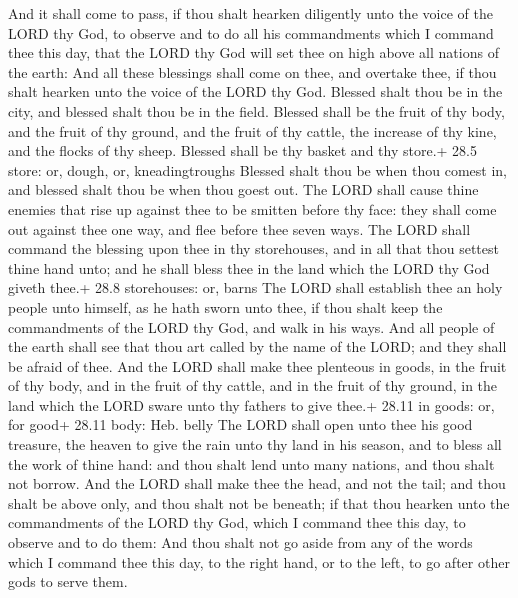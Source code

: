  And it shall come to pass, if thou shalt hearken diligently
unto the voice of the LORD thy God, to observe and to do all his
commandments which I command thee this day, that the LORD thy God will
set thee on high above all nations of the earth:  And all
these blessings shall come on thee, and overtake thee, if thou shalt
hearken unto the voice of the LORD thy God.  Blessed shalt
thou be in the city, and blessed shalt thou be in the field.
 Blessed shall be the fruit of thy body, and the fruit of
thy ground, and the fruit of thy cattle, the increase of thy kine, and
the flocks of thy sheep.  Blessed shall be thy basket and
thy store.+ 28.5 store: or, dough, or, kneadingtroughs 
Blessed shalt thou be when thou comest in, and blessed shalt thou be
when thou goest out.  The LORD shall cause thine enemies
that rise up against thee to be smitten before thy face: they shall come
out against thee one way, and flee before thee seven ways. 
The LORD shall command the blessing upon thee in thy storehouses, and in
all that thou settest thine hand unto; and he shall bless thee in the
land which the LORD thy God giveth thee.+ 28.8 storehouses: or, barns
 The LORD shall establish thee an holy people unto himself,
as he hath sworn unto thee, if thou shalt keep the commandments of the
LORD thy God, and walk in his ways.  And all people of the
earth shall see that thou art called by the name of the LORD; and they
shall be afraid of thee.  And the LORD shall make thee
plenteous in goods, in the fruit of thy body, and in the fruit of thy
cattle, and in the fruit of thy ground, in the land which the LORD sware
unto thy fathers to give thee.+ 28.11 in goods: or, for good+ 28.11
body: Heb. belly  The LORD shall open unto thee his good
treasure, the heaven to give the rain unto thy land in his season, and
to bless all the work of thine hand: and thou shalt lend unto many
nations, and thou shalt not borrow.  And the LORD shall
make thee the head, and not the tail; and thou shalt be above only, and
thou shalt not be beneath; if that thou hearken unto the commandments of
the LORD thy God, which I command thee this day, to observe and to do
them:  And thou shalt not go aside from any of the words
which I command thee this day, to the right hand, or to the left, to go
after other gods to serve them.

